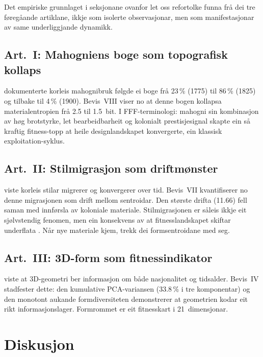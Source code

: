 \documentclass[12pt,a4paper]{article}
\begin{document}
Det empiriske grunnlaget i seksjonane ovanfor let oss refortolke funna fr\aa{} dei tre f\o{}reg\aa{}ande artiklane, ikkje som isolerte observasjonar, men som manifestasjonar av same underliggjande dynamikk.

\subsection{Art.~I: Mahogniens boge som topografisk kollaps}

\citet{finne2026a} dokumenterte korleis mahognibruk f\o{}lgde ei boge fr\aa{} 23\,\% (1775) til 86\,\% (1825) og tilbake til 4\,\% (1900). Bevis~VIII viser no at denne bogen kollapsa materialentropien fr\aa{} 2.5 til 1.5~bit. I FFF-terminologi: mahogni sin kombinasjon av h\o{}g brotstyrke, let bearbeidbarheit og kolonialt prestisjesignal \citep{zahavi1975} skapte ein s\aa{} kraftig fitness-topp at heile designlandskapet konvergerte, ein klassisk exploitation-syklus.

\subsection{Art.~II: Stilmigrasjon som driftm\o{}nster}

\citet{finne2026b} viste korleis stilar migrerer og konvergerer over tid. Bevis~VII kvantifiserer no denne migrasjonen som drift mellom sentroidar. Den st\o{}rste drifta (11.66) fell saman med innf\o{}rsla av koloniale materiale. Stilmigrasjonen er s\aa{}leis ikkje eit sj\o{}lvstendig fenomen, men ein konsekvens av at fitnesslandskapet skiftar underflata \citep{odlingsmee2003}. N\aa{}r nye materiale kjem, trekk dei formsentroidane med seg.

\subsection{Art.~III: 3D-form som fitnessindikator}

\citet{finne2026c} viste at 3D-geometri ber informasjon om b\aa{}de nasjonalitet og tidsalder. Bevis~IV stadfester dette: den kumulative PCA-variansen (33.8\,\% i tre komponentar) og den monotont aukande formdiversiteten demonstrerer at geometrien kodar eit rikt informasjonslager. Formrommet er eit fitnesskart i 21~dimensjonar.

\section{Diskusjon}
\label{sec:diskusjon}
\end{document}

